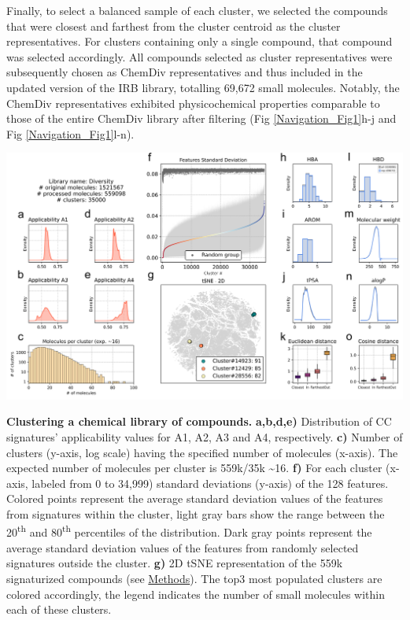 Finally, to select a balanced sample of each cluster, we selected the compounds that were closest and farthest from the cluster centroid as the cluster representatives. For clusters containing only a single compound, that compound was selected accordingly. All compounds selected as cluster representatives were subsequently chosen as ChemDiv representatives and thus included in the updated version of the IRB library, totalling 69,672 small molecules. Notably, the ChemDiv representatives exhibited physicochemical properties comparable to those of the entire ChemDiv library after filtering (Fig \ref{Navigation_Fig1}h-j and Fig \ref{Navigation_Fig1}l-n). 


\begin{Figure_modified}
  \centering
  \includegraphics[width=1\linewidth]{figures/Navigation/Main/Diversity_random_v3.png}
  \caption{\textbf{Clustering a chemical library of compounds.}
    \textbf{a,b,d,e)} Distribution of CC signatures’ applicability values for A1, A2, A3 and A4, respectively. 
    \textbf{c)} Number of clusters (y-axis, log scale) having the specified number of molecules (x-axis). The expected number of molecules per cluster is 559k/35k \textasciitilde 16.
    \textbf{f)} For each cluster (x-axis, labeled from 0 to 34,999) standard deviations (y-axis) of the 128 features. Colored points represent the average standard deviation values of the features from signatures within the cluster, light gray bars show the range between the 20\textsuperscript{th} and 80\textsuperscript{th} percentiles of the distribution. Dark gray points represent the average standard deviation values of the features from randomly selected signatures outside the cluster.
    \textbf{g)} 2D tSNE representation of the 559k signaturized compounds (see \hyperref[Navigation_Methods]{Methods}). The top3 most populated clusters are colored accordingly, the legend indicates the number of small molecules within each of these clusters.
}
\end{Figure_modified}
